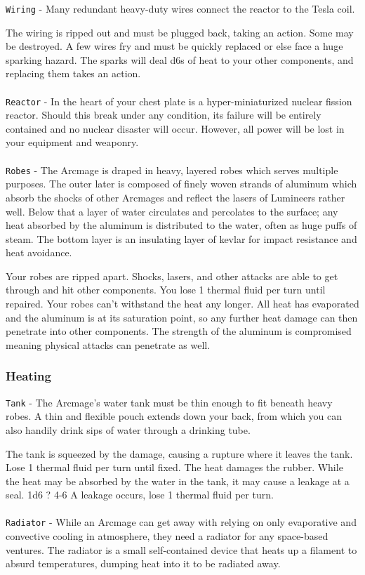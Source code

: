 \documentclass[a4paper]{article}
\begin{document}
\texttt{Wiring} - Many redundant heavy-duty wires connect the reactor to the Tesla coil. 

\ph
{The wiring is ripped out and must be plugged back, taking an action. Some may be destroyed.}
{A few wires fry and must be quickly replaced or else face a huge sparking hazard. The sparks will deal d6s of heat to your other components, and replacing them takes an action.}
\\ \\
\texttt{Reactor} - In the heart of your chest plate is a hyper-miniaturized nuclear fission reactor. Should this break under any condition, its failure will be entirely contained and no nuclear disaster will occur. However, all power will be lost in your equipment and weaponry. 
\\ \\
\texttt{Robes} - The Arcmage is draped in heavy, layered robes which serves multiple purposes. The outer later is composed of finely woven strands of aluminum which absorb the shocks of other Arcmages and reflect the lasers of Lumineers rather well. Below that a layer of water circulates and percolates to the surface; any heat absorbed by the aluminum is distributed to the water, often as huge puffs of steam. The bottom layer is an insulating layer of kevlar for impact resistance and heat avoidance.

\ph
{Your robes are ripped apart. Shocks, lasers, and other attacks are able to get through and hit other components. You lose 1 thermal fluid per turn until repaired. }
{Your robes can't withstand the heat any longer. All heat has evaporated and the aluminum is at its saturation point, so any further heat damage can then penetrate into other components. The strength of the aluminum is compromised meaning physical attacks can penetrate as well.}


\subsubsection{Heating}

\texttt{Tank} - The Arcmage's water tank must be thin enough to fit beneath heavy robes. A thin and flexible pouch extends down your back, from which you can also handily drink sips of water through a drinking tube.

\ph
{The tank is squeezed by the damage, causing a rupture where it leaves the tank. Lose 1 thermal fluid per turn until fixed.}
{The heat damages the rubber. While the heat may be absorbed by the water in the tank, it may cause a leakage at a seal. 1d6 ? 4-6 A leakage occurs, lose 1 thermal fluid per turn.}
\\ \\
\texttt{Radiator} - While an Arcmage can get away with relying on only evaporative and convective cooling in atmosphere, they need a radiator for any space-based ventures. The radiator is a small self-contained device that heats up a filament to absurd temperatures, dumping heat into it to be radiated away.
\end{document}
